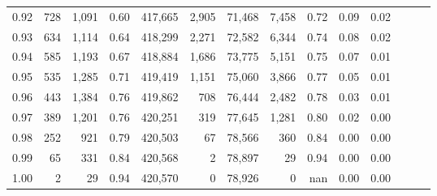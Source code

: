 \begin{tabular}{rrrrrrrrrrrrrr}
0.92 &    728 &  1,091 &  0.60 &  417,665 &    2,905 &  71,468 &   7,458 &  0.72 &  0.09 &      0.02 \\
0.93 &    634 &  1,114 &  0.64 &  418,299 &    2,271 &  72,582 &   6,344 &  0.74 &  0.08 &      0.02 \\
0.94 &    585 &  1,193 &  0.67 &  418,884 &    1,686 &  73,775 &   5,151 &  0.75 &  0.07 &      0.01 \\
0.95 &    535 &  1,285 &  0.71 &  419,419 &    1,151 &  75,060 &   3,866 &  0.77 &  0.05 &      0.01 \\
0.96 &    443 &  1,384 &  0.76 &  419,862 &      708 &  76,444 &   2,482 &  0.78 &  0.03 &      0.01 \\
0.97 &    389 &  1,201 &  0.76 &  420,251 &      319 &  77,645 &   1,281 &  0.80 &  0.02 &      0.00 \\
0.98 &    252 &    921 &  0.79 &  420,503 &       67 &  78,566 &     360 &  0.84 &  0.00 &      0.00 \\
0.99 &     65 &    331 &  0.84 &  420,568 &        2 &  78,897 &      29 &  0.94 &  0.00 &      0.00 \\
1.00 &      2 &     29 &  0.94 &  420,570 &        0 &  78,926 &       0 &   nan &  0.00 &      0.00 \\
\bottomrule
\end{tabular}
